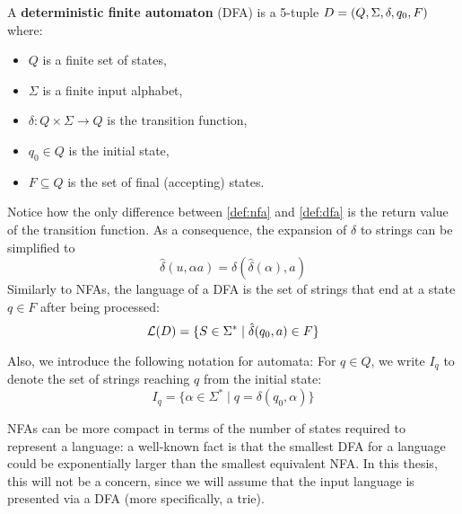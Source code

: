 \begin{definition} \label{def:dfa}
    A \textbf{deterministic finite automaton} (DFA) is a 5-tuple $D = (Q, \Sigma, \delta, q_0, F)$ where:
    \begin{itemize}
        \item $Q$ is a finite set of states,
        \item $\Sigma$ is a finite input alphabet,
        \item $\delta: Q \times \Sigma \rightarrow Q$ is the transition function,
        \item $q_0 \in Q$ is the initial state,
        \item $F \subseteq Q$ is the set of final (accepting) states.
    \end{itemize}
\end{definition}
Notice how the only difference between \cref{def:nfa} and \cref{def:dfa} is the return value of the transition function.
As a consequence, the expansion of $\delta$ to strings can be simplified to 
\[
    \hat\delta(u, \alpha a) = \delta(\hat\delta(\alpha), a)
\]
Similarly to NFAs, the language of a DFA is the set of strings that end at a state $q \in F$ after being processed:
\[
    \mathcal{L}(D) = \{S \in \Sigma^* \mid \hat\delta(q_0, a) \in F\}
\]

Also, we introduce the following notation for automata: For \( q \in Q \), we write \( I_q \) to denote the set of strings reaching \( q \) from the initial state:
\[
I_q = \{ \alpha \in \Sigma^* \mid q = \delta(q_0, \alpha) \}
\]

NFAs can be more compact in terms of the number of states required to represent a language: a well-known fact is that the smallest DFA for a language could be exponentially larger than the smallest equivalent NFA. In this thesis, this will not be a concern, since we will assume that the input language is presented via a DFA (more specifically, a trie). 


